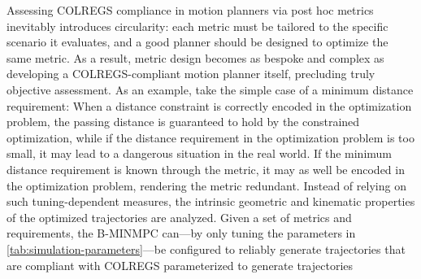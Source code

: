 Assessing COLREGS compliance in motion planners via post hoc metrics inevitably introduces circularity: each metric must be tailored to the specific scenario it evaluates, and a good planner should be designed to optimize the same metric. 
As a result, metric design becomes as bespoke and complex as developing a COLREGS-compliant motion planner itself, precluding truly objective assessment.  As an example, take the simple case of a minimum distance requirement: When a distance constraint is correctly encoded in the optimization problem, the passing distance is guaranteed to hold by the constrained optimization, while if the distance requirement in the optimization problem is too small, it may lead to a dangerous situation in the real world.  If the minimum distance requirement is known through the metric, it may as well be encoded in the optimization problem, rendering the metric redundant. 
Instead of relying on such tuning-dependent measures, the intrinsic geometric and kinematic properties of the optimized trajectories are analyzed.  Given a set of metrics and requirements, the B-MINMPC can---by only tuning the parameters in \cref{tab:simulation-parameters}---be configured to reliably generate trajectories that are compliant with COLREGS 
parameterized to generate trajectories




